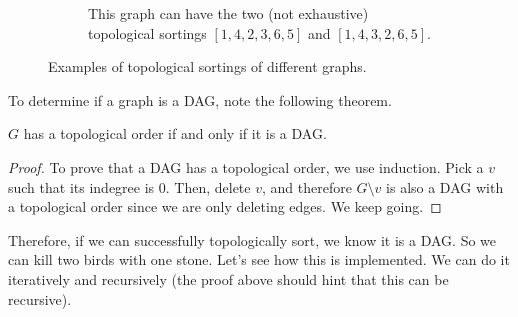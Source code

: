 \documentclass{article}
\begin{document}
\begin{definition}
\begin{figure}[H]
\begin{subfigure}[b]{0.48\textwidth}
          \caption{This graph can have the two (not exhaustive) topological sortings $[1, 4, 2, 3, 6, 5]$ and $[1, 4, 3, 2, 6, 5]$.}
          \label{fig:top_sort_unique}
        \end{subfigure}
        \caption{Examples of topological sortings of different graphs. }
        \label{fig:top_sort}
      \end{figure}
    \end{definition}

    To determine if a graph is a DAG, note the following theorem. 

    \begin{theorem}
      $G$ has a topological order if and only if it is a DAG. 
    \end{theorem}
    \begin{proof}
      To prove that a DAG has a topological order, we use induction. Pick a $v$ such that its indegree is $0$. Then, delete $v$, and therefore $G \setminus v$ is also a DAG with a topological order since we are only deleting edges. We keep going. 
    \end{proof}

    Therefore, if we can successfully topologically sort, we know it is a DAG. So we can kill two birds with one stone. Let's see how this is implemented. We can do it iteratively and recursively (the proof above should hint that this can be recursive). 
\end{document}

